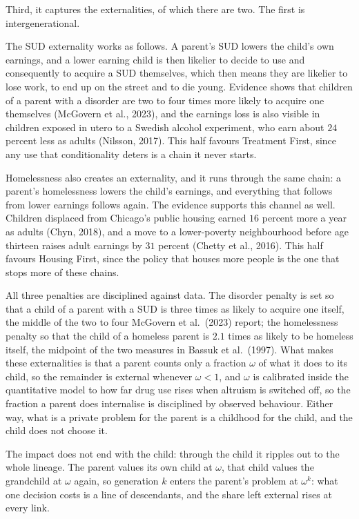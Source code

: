 \documentclass[10pt]{article}
\begin{document}
Third, it captures the externalities, of which there are two. The first is
intergenerational.

The SUD externality works as follows. A parent's SUD lowers the child's own earnings,
and a lower earning child is then likelier to decide to use and consequently to
acquire a SUD themselves, which then means they are likelier to lose work, to end up on
the street and to die young. Evidence shows that children of a parent with a disorder
are two to four times more likely to acquire one themselves (McGovern et al., 2023), and
the earnings loss is also visible in children exposed in utero to a Swedish  alcohol experiment, who earn about $24$ percent less as adults
(Nilsson, 2017). This half favours Treatment First, since any use that conditionality
deters is a chain it never starts.

Homelessness also creates an externality, and it runs through the same chain: a
parent's homelessness lowers the child's earnings, and everything that follows from
lower earnings follows again. The evidence supports this channel as well. Children
displaced from Chicago's public housing earned $16$ percent more a year as adults
(Chyn, 2018), and a move to a lower-poverty neighbourhood before age thirteen raises
adult earnings by $31$ percent (Chetty et al., 2016). This half favours Housing First,
since the policy that houses more people is the one that stops more of these chains.

All three penalties are disciplined against data. The disorder penalty is set so that
a child of a parent with a SUD is three times as likely to acquire one itself, the
middle of the two to four McGovern et al.\ (2023) report; the homelessness penalty so that
the child of a homeless parent is $2.1$ times as likely to be homeless itself, the midpoint
of the two measures in Bassuk et al.\ (1997). What makes these externalities is
that a parent counts only a fraction $\omega$ of what it does to its child, so the
remainder is external whenever $\omega<1$, and $\omega$ is calibrated inside the
quantitative model to how far drug use rises when altruism is switched off, so the
fraction a parent does internalise is disciplined by observed behaviour. Either way, what is a
private problem for the parent is a childhood for the child, and the child does not
choose it.

The impact does not end with the child: through the child it ripples out to the whole
lineage. The parent values its own child
at $\omega$, that child values the grandchild at $\omega$ again, so generation $k$
enters the parent's problem at $\omega^k$: what one decision costs is a line of
descendants, and the share left external rises at every link.
\end{document}
